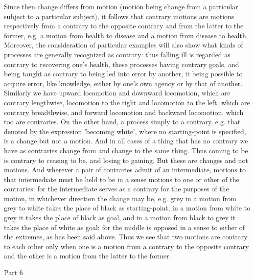 Since then change differs from motion (motion being change from a
particular subject to a particular subject), it follows that contrary
motions are motions respectively from a contrary to the opposite contrary
and from the latter to the former, e.g. a motion from health to disease
and a motion from disease to health. Moreover, the consideration of
particular examples will also show what kinds of processes are generally
recognized as contrary: thus falling ill is regarded as contrary to
recovering one's health, these processes having contrary goals, and
being taught as contrary to being led into error by another, it being
possible to acquire error, like knowledge, either by one's own agency
or by that of another. Similarly we have upward locomotion and downward
locomotion, which are contrary lengthwise, locomotion to the right
and locomotion to the left, which are contrary breadthwise, and forward
locomotion and backward locomotion, which too are contraries. On the
other hand, a process simply to a contrary, e.g. that denoted by the
expression 'becoming white', where no starting-point is specified,
is a change but not a motion. And in all cases of a thing that has
no contrary we have as contraries change from and change to the same
thing. Thus coming to be is contrary to ceasing to be, and losing
to gaining. But these are changes and not motions. And wherever a
pair of contraries admit of an intermediate, motions to that intermediate
must be held to be in a sense motions to one or other of the contraries:
for the intermediate serves as a contrary for the purposes of the
motion, in whichever direction the change may be, e.g. grey in a motion
from grey to white takes the place of black as starting-point, in
a motion from white to grey it takes the place of black as goal, and
in a motion from black to grey it takes the place of white as goal:
for the middle is opposed in a sense to either of the extremes, as
has been said above. Thus we see that two motions are contrary to
each other only when one is a motion from a contrary to the opposite
contrary and the other is a motion from the latter to the former.

Part 6


